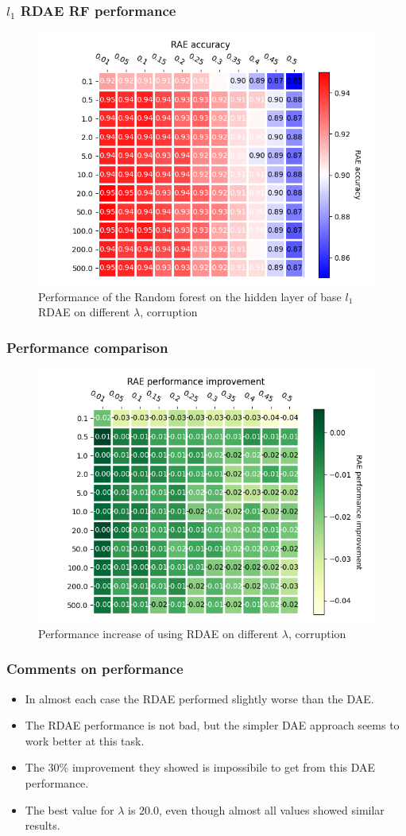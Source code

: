 \documentclass{beamer}
\theoremstyle{plain}
\theoremstyle{definition}
\theoremstyle{remark}
\begin{document}
\begin{frame}
	\frametitle{$l_1$ RDAE RF performance}
	\begin{figure}
		\centering
		\includegraphics[width=0.65\linewidth]{Images/RAE_acc.png}
		\caption[]{Performance of the Random forest on the hidden layer of base $l_1$ RDAE on different $\lambda$, corruption}
	\end{figure}
\end{frame}

\begin{frame}
	\frametitle{Performance comparison}
	\begin{figure}
		\centering
		\includegraphics[width=0.7\linewidth]{Images/performance.png}
		\caption[]{Performance increase of using RDAE on different $\lambda$, corruption}
	\end{figure}
\end{frame}

\begin{frame}
	\frametitle{Comments on performance}
	\begin{itemize}
		\item In almost each case the RDAE performed slightly worse than the DAE.
		\item The RDAE performance is not bad, but the simpler DAE approach seems to work better at this task.
		\item The $30\%$ improvement they showed is impossibile to get from this DAE performance. 
		\item The best value for $\lambda$ is $20.0$, even though almost all values showed similar results.
	\end{itemize}
\end{frame}
\end{document}
